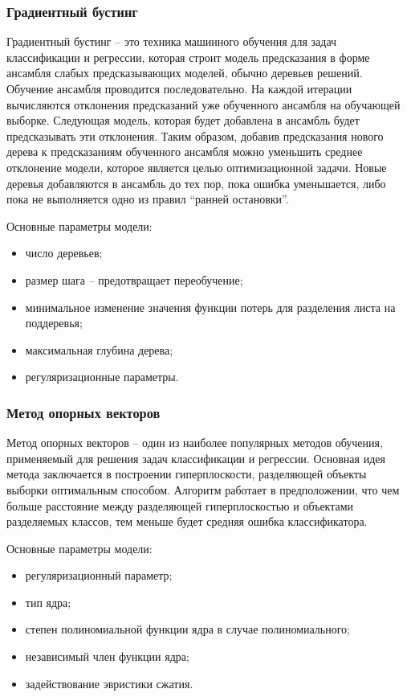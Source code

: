 \subsubsection{Градиентный бустинг}
Градиентный бустинг -- это техника машинного обучения для задач классификации и регрессии, которая строит модель предсказания в форме ансамбля слабых предсказывающих моделей, обычно деревьев решений. Обучение ансамбля проводится последовательно. На каждой итерации вычисляются отклонения предсказаний уже обученного ансамбля на обучающей выборке. Следующая модель, которая будет добавлена в ансамбль будет предсказывать эти отклонения. Таким образом, добавив предсказания нового дерева к предсказаниям обученного ансамбля можно уменьшить среднее отклонение модели, которое является целью оптимизационной задачи. Новые деревья добавляются в ансамбль до тех пор, пока ошибка уменьшается, либо пока не выполняется одно из правил ``ранней остановки''. \cite{boosting}

Основные параметры модели:
\begin{itemize}
\item число деревьев;
\item размер шага -- предотвращает переобучение;
\item минимальное изменение значения функции потерь для разделения листа на поддеревья;
\item максимальная глубина дерева;
\item регуляризационные параметры.
\end{itemize}

\subsubsection{Метод опорных векторов}
Метод опорных векторов -- один из наиболее популярных методов обучения, применяемый для решения задач классификации и регрессии. Основная идея метода заключается в построении гиперплоскости, разделяющей объекты выборки оптимальным способом. Алгоритм работает в предположении, что чем больше расстояние между разделяющей гиперплоскостью и объектами разделяемых классов, тем меньше будет средняя ошибка классификатора. \cite{svm}

Основные параметры модели:
\begin{itemize}
\item регуляризационный параметр;
\item тип ядра;
\item степен полиномиальной функции ядра в случае полиномиального;
\item независимый член функции ядра;
\item задействование эвристики сжатия.
\end{itemize}

